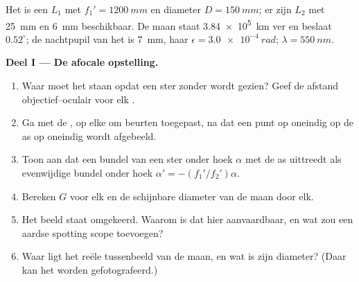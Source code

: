 \begin{problem}
\label{pb:b1:optical-instruments:1}
Het  is een  $L_1$ met 
$f_1' = \qty{1200}{mm}$ en diameter $D = \qty{150}{mm}$; er zijn 
$L_2$ met  \qty{25}{mm} en \qty{6}{mm} beschikbaar. De
maan staat \qty{3.84e5}{km} ver en beslaat $0.52^\circ$; de nachtpupil van
het  is \qty{7}{mm}, haar  $\epsilon = \qty{3.0e-4}{rad}$;
$\lambda = \qty{550}{nm}$.

\medskip
\noindent\textbf{Deel I --- De afocale opstelling.}
\begin{enumerate}
  \item Waar moet het  staan opdat een ster zonder 
        wordt gezien? Geef de afstand objectief--oculair voor elk
        .
  \item Ga met de , op elke  om beurten
        toegepast, na dat een punt op oneindig op de as op oneindig wordt afgebeeld.
  \item Toon aan dat een bundel van een ster onder hoek $\alpha$ met de as
        uittreedt als evenwijdige bundel onder hoek $\alpha' = -(f_1'/f_2')\alpha$.
  \item Bereken $G$ voor elk  en de schijnbare diameter van de
        maan door elk.
  \item Het beeld staat omgekeerd. Waarom is dat hier aanvaardbaar, en wat
        zou een aardse spotting scope toevoegen?
  \item Waar ligt het reële tussenbeeld van de maan, en wat is
        zijn diameter? (Daar kan het worden gefotografeerd.)
\end{enumerate}


\end{problem}
